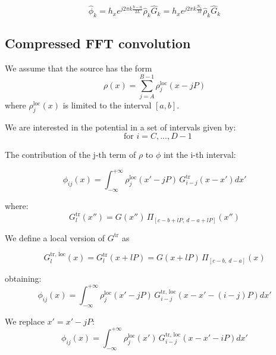 \begin{equation}
\hat{\phi}_k  = 
h_x e^{j2\pi k \frac{b-a}{2L}} 
\hat{\rho}_k \hat{G}_k
=
h_x e^{j2\pi k \frac{N_1}{M}} 
\hat{\rho}_k \hat{G}_k
\end{equation}


\subsection{Compressed FFT convolution}

We assume that the source has the form
\begin{equation}
\rho(x) =  \sum_{j=A}^{B-1} \rho^\text{loc}_j(x - jP)
\label{eq:rholim_period}
\end{equation}
where $\rho^\text{loc}_j(x)$ is limited to the interval $[a, b]$.

We are interested in the potential in a set of intervals given by:
\begin{equation}
[c+iP,~d+iP]~~\text{ for } i=C, ... , D-1
\end{equation}

The contribution of the j-th term of $\rho$ to  $\phi$ int the i-th interval:

\begin{equation}
\phi_{ij}(x) = 
\int_{-\infty}^{+\infty} 
\rho^\text{loc}_j(x' - jP)\,G^\text{tr}_{i-j}(x-x') dx'
\end{equation}

where:
\begin{equation}
G^\text{tr}_l(x'') = G(x'')\,
\Pi_{[c-b+lP,~d-a+lP]}
\left(
{x''}
\right)
\end{equation}

We define a local version of $G^\text{tr}$ as

\begin{equation}
G^\text{tr, loc}_l(x) = G^\text{tr}_l(x + lP) 
=
G(x +lP)\,
\Pi_{[c-b,~d-a]}
\left(x\right)
\end{equation}

obtaining:
\begin{equation}
\phi_{ij}(x) = 
\int_{-\infty}^{+\infty} 
\rho^\text{loc}_j(x' - jP)\,G^\text{tr, loc}_{i-j}(x-x'-(i-j)P) dx'
\end{equation}

We replace $x' = x' - jP$:
\begin{equation}
\phi_{ij}(x) = 
\int_{-\infty}^{+\infty} 
\rho^\text{loc}_j(x')\,G^\text{tr, loc}_{i-j}(x-x' - iP) dx'
\end{equation}

